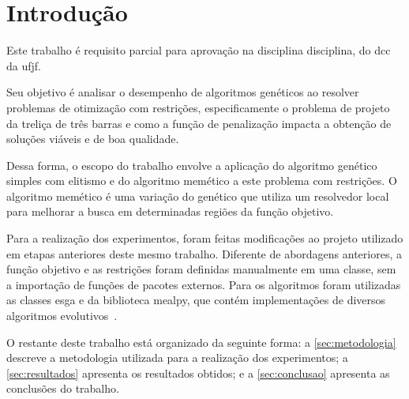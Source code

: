 \section{Introdução}%
\label{sec:introducao}

Este trabalho é requisito parcial para aprovação na disciplina \gls{disciplina}, do \gls{dcc} da \gls{ufjf}.

Seu objetivo é analisar o desempenho de algoritmos genéticos ao resolver problemas de otimização com restrições, especificamente o problema de projeto da treliça de três barras e como a função de penalização impacta a obtenção de soluções viáveis e de boa qualidade.

Dessa forma, o escopo do trabalho envolve a aplicação do algoritmo genético simples com elitismo e do algoritmo memético a este problema com restrições. O algoritmo memético é uma variação do genético que utiliza um resolvedor local para melhorar a busca em determinadas regiões da função objetivo.

Para a realização dos experimentos, foram feitas modificações ao projeto utilizado em etapas anteriores deste mesmo trabalho. Diferente de abordagens anteriores, a função objetivo e as restrições foram definidas manualmente em uma classe, sem a importação de funções de pacotes externos.
Para os algoritmos foram utilizadas as classes \gls{esga} e da biblioteca \gls{mealpy}, que contém implementações de diversos algoritmos evolutivos~\cite{mealpy_paper}.


O restante deste trabalho está organizado da seguinte forma: a \autoref{sec:metodologia} descreve a metodologia utilizada para a realização dos experimentos; a \autoref{sec:resultados} apresenta os resultados obtidos; e a \autoref{sec:conclusao} apresenta as conclusões do trabalho.
